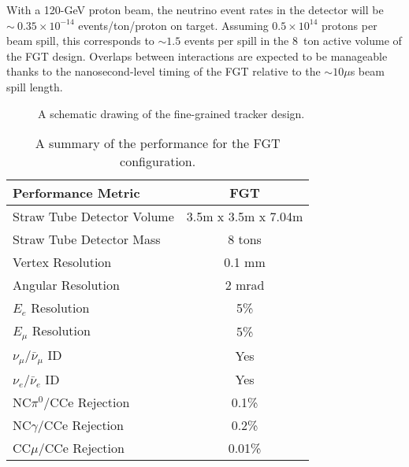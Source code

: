 With a 120-GeV proton beam, the neutrino event rates in the detector
will be $\sim~0.35\times 10^{-14}$ events/ton/proton on target.
Assuming $0.5\times 10^{14}$ protons per beam spill, this corresponds
to $\sim 1.5$ events per spill in the 8~ton active volume of the FGT
design.  Overlaps between interactions are expected to be
manageable thanks to the nanosecond-level timing of the FGT relative to
the $\sim 10 \mu$s beam spill length.

\begin{figure}
\begin{center}
\caption{\label{STT_schematic} A schematic drawing of the fine-grained
tracker design.} 
\end{center}
\end{figure}

\begin{table}
\centering
  \caption{\label{tab:comparison} A summary of the performance for 
the FGT configuration.}
  \begin{tabular}{| l | c |}
    \hline
Performance Metric&FGT \\
    \hline
Straw Tube Detector Volume & 3.5m x 3.5m x 7.04m \\
Straw Tube Detector Mass&8 tons \\
Vertex Resolution&0.1 mm \\
Angular Resolution&2 mrad \\
$E_e$ Resolution&5\% \\
$E_\mu$ Resolution&5\% \\
$\nu_\mu/\bar \nu_\mu$ ID&Yes \\
$\nu_e/\bar \nu_e$ ID&Yes \\
NC$\pi^0$/CCe Rejection&0.1\% \\
NC$\gamma$/CCe Rejection&0.2\% \\
CC$\mu$/CCe Rejection&0.01\% \\
     \hline
  \end{tabular}
\end{table}

